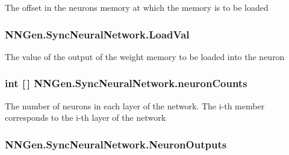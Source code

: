 The offset in the neuron\textquotesingle{}s memory at which the memory is to be loaded 

\hypertarget{class_n_n_gen_1_1_sync_neural_network_a69b1e243c9d77ba27a38e3859147f588}{}
\subsubsection[{Load\+Val}]{ N\+N\+Gen.\+Sync\+Neural\+Network.\+Load\+Val\hspace{0.3cm}{\ttfamily [get]}}\label{class_n_n_gen_1_1_sync_neural_network_a69b1e243c9d77ba27a38e3859147f588}


The value of the output of the weight memory to be loaded into the neuron 

\hypertarget{class_n_n_gen_1_1_sync_neural_network_aed5af731ce355a68af7607477e8544e9}{}
\subsubsection[{neuron\+Counts}]{\setlength{\rightskip}{0pt plus 5cm}int \mbox{[}$\,$\mbox{]} N\+N\+Gen.\+Sync\+Neural\+Network.\+neuron\+Counts\hspace{0.3cm}{\ttfamily [get]}}\label{class_n_n_gen_1_1_sync_neural_network_aed5af731ce355a68af7607477e8544e9}


The number of neurons in each layer of the network. The i-\/th member corresponds to the i-\/th layer of the network 

\hypertarget{class_n_n_gen_1_1_sync_neural_network_ad10e93be47aead04db2b445124bb6649}{}
\subsubsection[{Neuron\+Outputs}]{ N\+N\+Gen.\+Sync\+Neural\+Network.\+Neuron\+Outputs\hspace{0.3cm}{\ttfamily [get]}}\label{class_n_n_gen_1_1_sync_neural_network_ad10e93be47aead04db2b445124bb6649}


